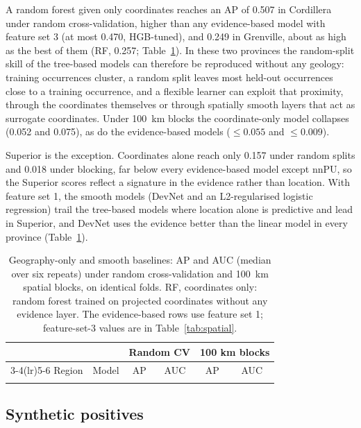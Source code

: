 \documentclass[pdflatex,sn-apa]{sn-jnl}
\begin{document}
A random forest given only coordinates reaches an AP of 0.507 in Cordillera under random cross-validation, higher than any evidence-based model with feature set 3 (at most 0.470, HGB-tuned), and 0.249 in Grenville, about as high as the best of them (RF, 0.257; Table~\ref{tab:geography}). In these two provinces the random-split skill of the tree-based models can therefore be reproduced without any geology: training occurrences cluster, a random split leaves most held-out occurrences close to a training occurrence, and a flexible learner can exploit that proximity, through the coordinates themselves or through spatially smooth layers that act as surrogate coordinates. Under 100~km blocks the coordinate-only model collapses (0.052 and 0.075), as do the evidence-based models ($\leq 0.055$ and $\leq 0.009$).

Superior is the exception. Coordinates alone reach only 0.157 under random splits and 0.018 under blocking, far below every evidence-based model except nnPU, so the Superior scores reflect a signature in the evidence rather than location. With feature set 1, the smooth models (DevNet and an L2-regularised logistic regression) trail the tree-based models where location alone is predictive and lead in Superior, and DevNet uses the evidence better than the linear model in every province (Table~\ref{tab:geography}).

\begin{table}[t]
\caption{Geography-only and smooth baselines: AP and AUC (median over six repeats) under random cross-validation and 100~km spatial blocks, on identical folds. RF, coordinates only: random forest trained on projected coordinates without any evidence layer. The evidence-based rows use feature set 1; feature-set-3 values are in Table~\ref{tab:spatial}.}\label{tab:geography}
\footnotesize
\setlength{\tabcolsep}{3pt}
\begin{tabular*}{\textwidth}{@{\extracolsep\fill}llcccc}
\toprule
 & & \multicolumn{2}{c}{Random CV} & \multicolumn{2}{c}{100 km blocks} \\
\cmidrule(lr){3-4}\cmidrule(lr){5-6}
Region & Model & AP & AUC & AP & AUC \\
\midrule
\botrule
\end{tabular*}
\end{table}

\subsection{Synthetic positives}\label{sec:res-augmentation}
\end{document}
